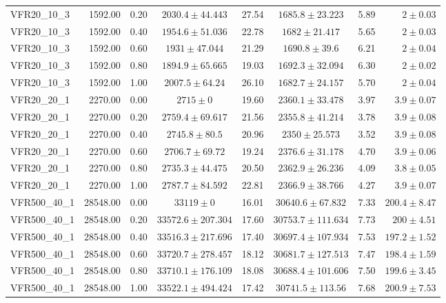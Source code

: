 \begin{longtable}{lrrccccr}
  VFR20\_10\_3 & 1592.00 & 0.20 & $2030.4 \pm 44.443$ & 27.54 & $1685.8 \pm 23.223$ & 5.89 & $2 \pm 0.03$ \\ 
  VFR20\_10\_3 & 1592.00 & 0.40 & $1954.6 \pm 51.036$ & 22.78 & $1682 \pm 21.417$ & 5.65 & $2 \pm 0.03$ \\ 
  VFR20\_10\_3 & 1592.00 & 0.60 & $1931 \pm 47.044$ & 21.29 & $1690.8 \pm 39.6$ & 6.21 & $2 \pm 0.04$ \\ 
  VFR20\_10\_3 & 1592.00 & 0.80 & $1894.9 \pm 65.665$ & 19.03 & $1692.3 \pm 32.094$ & 6.30 & $2 \pm 0.02$ \\ 
  VFR20\_10\_3 & 1592.00 & 1.00 & $2007.5 \pm 64.24$ & 26.10 & $1682.7 \pm 24.157$ & 5.70 & $2 \pm 0.04$ \\ 
   \midrule
VFR20\_20\_1 & 2270.00 & 0.00 & $2715 \pm 0$ & 19.60 & $2360.1 \pm 33.478$ & 3.97 & $3.9 \pm 0.07$ \\ 
  VFR20\_20\_1 & 2270.00 & 0.20 & $2759.4 \pm 69.617$ & 21.56 & $2355.8 \pm 41.214$ & 3.78 & $3.9 \pm 0.08$ \\ 
  VFR20\_20\_1 & 2270.00 & 0.40 & $2745.8 \pm 80.5$ & 20.96 & $2350 \pm 25.573$ & 3.52 & $3.9 \pm 0.08$ \\ 
  VFR20\_20\_1 & 2270.00 & 0.60 & $2706.7 \pm 69.72$ & 19.24 & $2376.6 \pm 31.178$ & 4.70 & $3.9 \pm 0.06$ \\ 
  VFR20\_20\_1 & 2270.00 & 0.80 & $2735.3 \pm 44.475$ & 20.50 & $2362.9 \pm 26.236$ & 4.09 & $3.8 \pm 0.05$ \\ 
  VFR20\_20\_1 & 2270.00 & 1.00 & $2787.7 \pm 84.592$ & 22.81 & $2366.9 \pm 38.766$ & 4.27 & $3.9 \pm 0.07$ \\ 
   \midrule
VFR500\_40\_1 & 28548.00 & 0.00 & $33119 \pm 0$ & 16.01 & $30640.6 \pm 67.832$ & 7.33 & $200.4 \pm 8.47$ \\ 
  VFR500\_40\_1 & 28548.00 & 0.20 & $33572.6 \pm 207.304$ & 17.60 & $30753.7 \pm 111.634$ & 7.73 & $200 \pm 4.51$ \\ 
  VFR500\_40\_1 & 28548.00 & 0.40 & $33516.3 \pm 217.696$ & 17.40 & $30697.4 \pm 107.934$ & 7.53 & $197.2 \pm 1.52$ \\ 
  VFR500\_40\_1 & 28548.00 & 0.60 & $33720.7 \pm 278.457$ & 18.12 & $30681.7 \pm 127.513$ & 7.47 & $198.4 \pm 1.59$ \\ 
  VFR500\_40\_1 & 28548.00 & 0.80 & $33710.1 \pm 176.109$ & 18.08 & $30688.4 \pm 101.606$ & 7.50 & $199.6 \pm 3.45$ \\ 
  VFR500\_40\_1 & 28548.00 & 1.00 & $33522.1 \pm 494.424$ & 17.42 & $30741.5 \pm 113.56$ & 7.68 & $200.9 \pm 7.53$ \\ 

\end{longtable}

